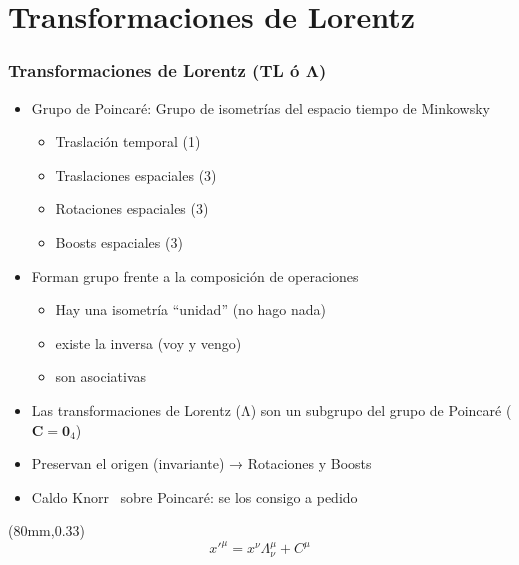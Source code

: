 \documentclass[xetex,mathserif,serif,10pt]{beamer}
\begin{document}
\section{Transformaciones de Lorentz}
\begin{frame}
  \frametitle{Transformaciones de Lorentz (TL ó Λ)}
  \begin{itemize}
    \item Grupo de Poincaré: Grupo de isometrías del espacio tiempo de Minkowsky
    \begin{itemize}
      \item Traslación temporal (1)
      \item Traslaciones espaciales (3)
      \item Rotaciones espaciales (3)
      \item Boosts espaciales (3)
    \end{itemize}
    \item Forman grupo frente a la composición de operaciones
    \begin{itemize}
      \item Hay una isometría “unidad” (no hago nada)
      \item existe la inversa (voy y vengo)
      \item son asociativas
    \end{itemize}
    \item Las transformaciones de Lorentz (Λ) son un subgrupo del grupo de Poincaré ($\mathbf{C}=\mathbf{0}_4$)
    \item Preservan el origen (invariante) → Rotaciones y Boosts
    \item Caldo Knorr\textregistered~ sobre Poincaré: se los consigo a pedido
  \end{itemize}
  \begin{textblock*}{38mm}(80mm,0.33\textheight)
    \large{
      \begin{equation}
        x'^\mu = x^\nu \Lambda^\mu_\nu+C^\mu
      \end{equation}
    }
  \end{textblock*}
\end{frame}
\end{document}
